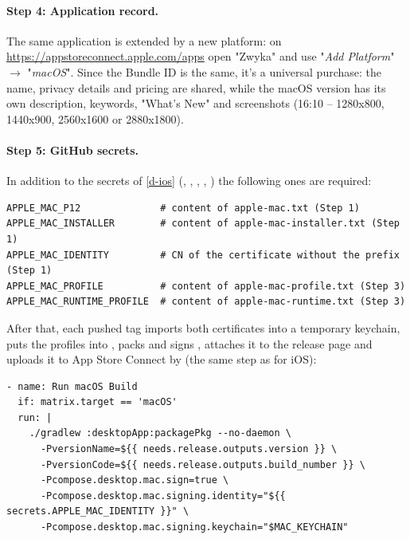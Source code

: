 \paragraph{Step 4: Application record.} The same application is extended by a new platform: on
\href{https://appstoreconnect.apple.com/apps}{https://appstoreconnect.apple.com/apps} open "Zwyka" and use
"\emph{Add Platform}" $\rightarrow$ "\emph{macOS}". Since the Bundle ID is the same, it's a universal purchase: the
name, privacy details and pricing are shared, while the macOS version has its own description, keywords, "What's New" and
screenshots (16:10 -- 1280x800, 1440x900, 2560x1600 or 2880x1800).

\paragraph{Step 5: GitHub secrets.} In addition to the secrets of \ref{d-ios} (,
, , , ) the following ones are required:

\begin{lstlisting}[language=terminal]
APPLE_MAC_P12              # content of apple-mac.txt (Step 1)
APPLE_MAC_INSTALLER        # content of apple-mac-installer.txt (Step 1)
APPLE_MAC_IDENTITY         # CN of the certificate without the prefix (Step 1)
APPLE_MAC_PROFILE          # content of apple-mac-profile.txt (Step 3)
APPLE_MAC_RUNTIME_PROFILE  # content of apple-mac-runtime.txt (Step 3)
\end{lstlisting}

\noindent After that, each pushed tag  imports both certificates into a temporary keychain, puts the profiles into
, packs and signs , attaches it to the release page and uploads it to App Store
Connect by  (the same step as for iOS):

\begin{lstlisting}[language=terminal]
- name: Run macOS Build
  if: matrix.target == 'macOS'
  run: |
    ./gradlew :desktopApp:packagePkg --no-daemon \
      -PversionName=${{ needs.release.outputs.version }} \
      -PversionCode=${{ needs.release.outputs.build_number }} \
      -Pcompose.desktop.mac.sign=true \
      -Pcompose.desktop.mac.signing.identity="${{ secrets.APPLE_MAC_IDENTITY }}" \
      -Pcompose.desktop.mac.signing.keychain="$MAC_KEYCHAIN"
\end{lstlisting}

